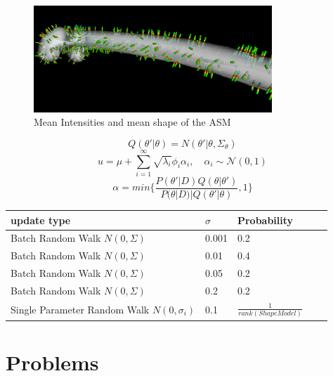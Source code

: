 \documentclass{article}
\begin{document}
	\begin{figure}
		\centering
			\centering
			\includegraphics[width=0.8\textwidth]{images/mean_pixelintensities.png}
			\caption{Mean Intensities and mean shape of the ASM}
			\label{1.1}
	\end{figure}	
	\begin{equation}
	Q(\theta' | \theta) = N(\theta'|\theta, \Sigma_\theta)
	\end{equation}
	\begin{equation}
	u = \mu + \sum_{i=1}^\infty \sqrt{\lambda_i} \phi_i \alpha_i, \quad \alpha_i \sim{} \mathcal{N}(0,1)
	\end{equation}
	\begin{equation}
		\alpha = min \{ \frac{P(\theta' | D ) Q(\theta|\theta')}{P(\theta|D) | Q(\theta'|\theta)}, 1\}
	\end{equation}
	\begin{center}
		\begin{tabular}{l l l l l}
			\toprule
			update type & $\sigma$ & Probability \\
			\midrule
			Batch Random Walk $N(0, \Sigma)$&  0.001 & 	0.2  	\\
			Batch Random Walk $N(0, \Sigma)$& 0.01 & 	0.4 	\\
			Batch Random Walk $N(0, \Sigma)$& 0.05 &	0.2		\\
			Batch Random Walk $N(0, \Sigma)$& 0.2&		0.2		\\
			Single Parameter Random Walk $N(0,\sigma_i)$ & 0.1& $\frac{1}{rank(ShapeModel)}$
		\end{tabular}
	\end{center}
	\section{Problems}
	
\end{document}
